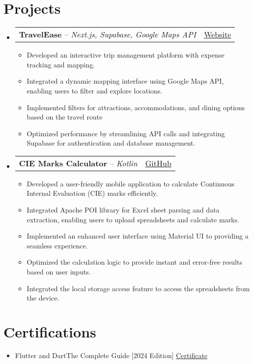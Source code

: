 \documentclass[a4paper,12pt]{article}
\makeatletter
\newcommand{\resumeItem}[1]{
  \item\small{
    {#1}\vspace{-2pt}
  }
}
\newcommand{\expSubheading}[3]{
  \vspace{-1pt}\item
    \begin{tabular*}{0.97\textwidth}{l@{\extracolsep{\fill}}r}
      \textbf{#1} -- \textit{#2} & #3 \\
    \end{tabular*}\vspace{-5pt}
}
\newcommand{\resumeSubHeadingListStart}{\begin{itemize}[leftmargin=*]}
\newcommand{\resumeSubHeadingListEnd}{\end{itemize}}
\newcommand{\resumeItemListStart}{\begin{itemize}}
\newcommand{\resumeItemListEnd}{\end{itemize}\vspace{-5pt}}
\makeatother
\begin{document}

\section{Projects}
\resumeSubHeadingListStart

\expSubheading
{TravelEase}{Next.js, Supabase, Google Maps API}{\href{http://travel-ease-mocha.vercel.app}{Website}}
\resumeItemListStart
\resumeItem
{Developed an interactive trip management platform with expense tracking and mapping.}
\resumeItem
{Integrated a dynamic mapping interface using Google Maps API, enabling users to filter and explore locations.}
\resumeItem
{Implemented filters for attractions, accommodations, and dining options based on the travel route}
\resumeItem
{Optimized performance by streamlining API calls and integrating Supabase for authentication and database management.}
\resumeItemListEnd


\expSubheading
{CIE Marks Calculator}{Kotlin}{\href{https://github.com/Surajsm60720/CIEMarksCalculator}{GitHub}}
\resumeItemListStart
\resumeItem
{Developed a user-friendly mobile application to calculate Continuous Internal Evaluation (CIE) marks efficiently.}
\resumeItem
{Integrated Apache POI library for Excel sheet parsing and data extraction, enabling users to upload spreadsheets and calculate marks.}
\resumeItem
{Implemented an enhanced user interface using Material UI to providing a seamless experience.}
\resumeItem
{Optimized the calculation logic to provide instant and error-free results based on user inputs.}
\resumeItem
{Integrated the local storage access feature to access the spreadsheets from the device.}
\resumeItemListEnd

\resumeSubHeadingListEnd


\section{Certifications}
\resumeSubHeadingListStart
\resumeItem
{Flutter and Dart\textendash The Complete Guide [2024 Edition]}{\hfill\href{https://www.udemy.com/certificate/UC-f97e04ad-6a49-41bc-9788-bf93ee049e9e/}{Certificate}}
\resumeSubHeadingListEnd
\end{document}
